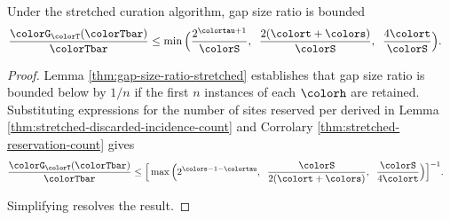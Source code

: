 \begin{theorem}
\label{thm:stretched-gap-size}
Under the stretched curation algorithm, gap size ratio is bounded
\begin{align*}
\frac{\colorG_{\colorT}(\colorTbar)}{\colorTbar}
&\leq
\min\Big(
  \frac{2^{\colortau+1}}{\colorS},\;\;
  \frac{2(\colort + \colors)}{\colorS},\;\;
  \frac{4\colort}{\colorS}
\Big).
\end{align*}
\end{theorem}
\begin{proof}

Lemma \ref{thm:gap-size-ratio-stretched} establishes that gap size ratio is bounded below by $1/n$ if the first $n$ instances of each \hv{} $\colorh$ are retained.
Substituting expressions for the number of sites reserved per \hv{} derived in Lemma \ref{thm:stretched-discarded-incidence-count} and Corrolary \ref{thm:stretched-reservation-count} gives
\begin{align*}
  \frac{\colorG_{\colorT}(\colorTbar)}{\colorTbar}
  &\leq
  \Big[
    \max\Big(
      2^{\colors - 1 - \colortau},\;\;
      \frac{\colorS}{2(\colort + \colors)},\;\;
      \frac{\colorS}{4\colort}
    \Big)
  \Big]^{-1}.
\end{align*}

Simplifying resolves the result.

\end{proof}
